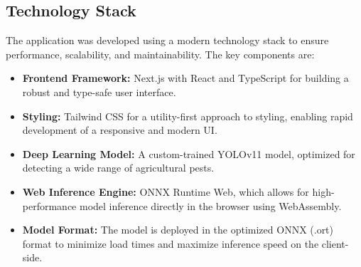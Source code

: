 \subsection{Technology Stack}
The application was developed using a modern technology stack to ensure performance, scalability, and maintainability. The key components are:
\begin{itemize}
    \item \textbf{Frontend Framework:} Next.js with React and TypeScript for building a robust and type-safe user interface.
    \item \textbf{Styling:} Tailwind CSS for a utility-first approach to styling, enabling rapid development of a responsive and modern UI.
    \item \textbf{Deep Learning Model:} A custom-trained YOLOv11 model, optimized for detecting a wide range of agricultural pests.
    \item \textbf{Web Inference Engine:} ONNX Runtime Web, which allows for high-performance model inference directly in the browser using WebAssembly.
    \item \textbf{Model Format:} The model is deployed in the optimized ONNX (.ort) format to minimize load times and maximize inference speed on the client-side.
\end{itemize}
